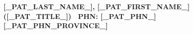 \documentclass[10pt,letterpaper]{letter}
\begin{document}
\vspace{-0.35in}
\begin{center}
\Large{\textsf{\textbf{ [_PAT_LAST_NAME_], [_PAT_FIRST_NAME_] ([_PAT_TITLE_]) $\:$ PHN: [_PAT_PHN_] [_PAT_PHN_PROVINCE_] }}} \\
\vspace{-0.15in}
\end{center}
\underline{\hspace{6.5in}}
\end{document}
